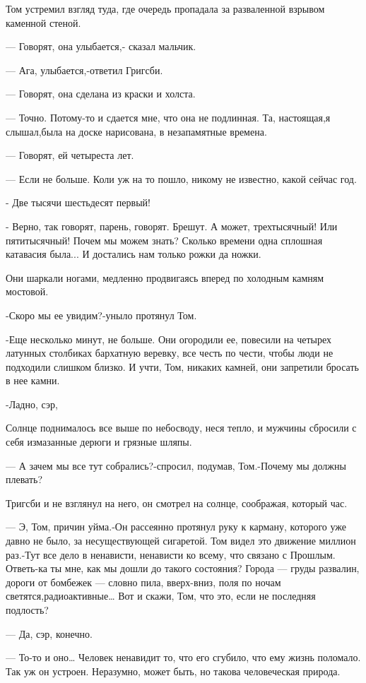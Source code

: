 Том устремил взгляд туда, где очередь пропадала за разваленной взрывом каменной
стеной.

— Говорят, она улыбается,- сказал мальчик.

— Ага, улыбается,-ответил Григсби.

— Говорят, она сделана из краски и холста.

— Точно. Потому-то и сдается мне, что она не подлинная. Та, настоящая,я
слышал,была на доске нарисована, в незапамятные времена.

— Говорят, ей четыреста лет.

— Если не больше. Коли уж на то пошло, никому не известно, какой сейчас год.

- Две тысячи шестьдесят первый!

- Верно, так говорят, парень, говорят. Брешут. А может, трехтысячный! Или
пятитысячный! Почем мы можем знать? Сколько времени одна сплошная катавасия
была... И достались нам только рожки да ножки.

Они шаркали ногами, медленно продвигаясь вперед по холодным камням мостовой.

-Скоро мы ее увидим?-уныло протянул Том.

-Еще несколько минут, не больше. Они огородили ее, повесили на четырех латунных
столбиках бархатную веревку, все честь по чести, чтобы люди не подходили
слишком близко. И учти, Том, никаких камней, они запретили бросать в нее камни.

-Ладно, сэр,

Солнце поднималось все выше по небосводу, неся тепло, и мужчины сбросили с себя
измазанные дерюги и грязные шляпы.

— А зачем мы все тут собрались?-спросил, подумав, Том.-Почему мы должны
плевать?

Тригсби и не взглянул на него, он смотрел на солнце, соображая, который час.

— Э, Том, причин уйма.-Он рассеянно протянул руку к карману, которого уже давно
не было, за несуществующей сигаретой. Том видел это движение миллион раз.-Тут
все дело в ненависти, ненависти ко всему, что связано с Прошлым. Ответь-ка ты
мне, как мы дошли до такого состояния? Города — груды развалин, дороги от
бомбежек — словно пила, вверх-вниз, поля по ночам светятся,радиоактивные… Вот и
скажи, Том, что это, если не последняя подлость?

— Да, сэр, конечно.

— То-то и оно… Человек ненавидит то, что его сгубило, что ему жизнь поломало.
Так уж он устроен. Неразумно, может быть, но такова человеческая природа.

